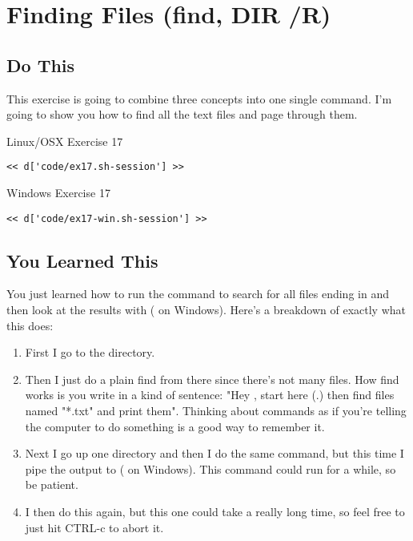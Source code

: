 \chapter{Finding Files (find, DIR /R)}

\section{Do This}

This exercise is going to combine three concepts into one single command.  I'm
going to show you how to find all the text files and page through them.

\begin{code}{Linux/OSX Exercise 17}
\begin{Verbatim}
<< d['code/ex17.sh-session'] >>
\end{Verbatim}
\end{code}

\begin{code}{Windows Exercise 17}
\begin{Verbatim}
<< d['code/ex17-win.sh-session'] >>
\end{Verbatim}
\end{code}

\section{You Learned This}

You just learned how to run the  command to search for all files
ending in  and then look at the results with  ( on Windows).  Here's a breakdown of exactly what this does:

\begin{enumerate}
\item First I go to the  directory.
\item Then I just do a plain find from there since there's not many 
files.  How find works is you write in a kind of sentence: "Hey ,
    start here (.) then find files named "*.txt" and print them".  Thinking
    about commands as if you're telling the computer to do something is a good
    way to remember it.
\item Next I go up one directory and then I do the same command, but this time I pipe the output to  ( on Windows).  This command could run for a while, so be patient.
\item I then do this again, but this one could take a really long time, so feel free to just hit CTRL-c to abort it.
\end{enumerate}


